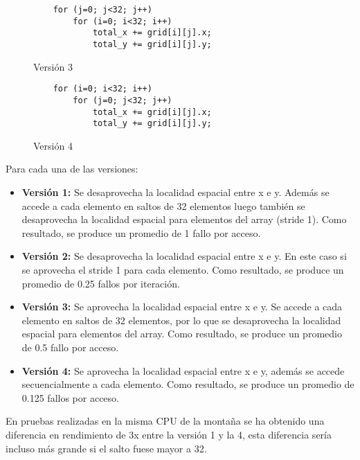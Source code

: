 \begin{ejemplo}
    \begin{figure}[H]
        \centering
        \begin{minipage}{0.4\textwidth}
            \begin{verbatim}
    for (j=0; j<32; j++)
        for (i=0; i<32; i++)
            total_x += grid[i][j].x;
            total_y += grid[i][j].y;
            \end{verbatim}
            \caption{Versión 3}
        \end{minipage}
        \hspace{1cm}
        \begin{minipage}{0.4\textwidth}
            \begin{verbatim}
    for (i=0; i<32; i++)
        for (j=0; j<32; j++)
            total_x += grid[i][j].x;
            total_y += grid[i][j].y;
            \end{verbatim}
            \caption{Versión 4}
        \end{minipage}
    \end{figure}
    Para cada una de las versiones:
    \begin{itemize}
        \item \textbf{Versión 1:} Se desaprovecha la localidad espacial entre x e y. Además se accede a cada elemento en saltos de 32 elementos luego también se desaprovecha la localidad
            espacial para elementos del array (stride 1). Como resultado, se produce un promedio de 1 fallo por acceso.
        \item \textbf{Versión 2:} Se desaprovecha la localidad espacial entre x e y. En este caso si se aprovecha el stride 1 para cada elemento. Como resultado, se produce un promedio de 0.25 fallos por iteración.
        \item \textbf{Versión 3:} Se aprovecha la localidad espacial entre x e y. Se accede a cada elemento en saltos de 32 elementos, por lo que se desaprovecha la localidad espacial para elementos del array. Como resultado, se produce un promedio de 0.5 fallo por acceso.
        \item \textbf{Versión 4:} Se aprovecha la localidad espacial entre x e y, además se accede secuencialmente a cada elemento. Como resultado, se produce un promedio de 0.125 fallos por acceso.
    \end{itemize}
    En pruebas realizadas en la misma CPU de la montaña se ha obtenido una diferencia en rendimiento de 3x entre la versión 1 y la 4, esta diferencia sería incluso más grande si el salto fuese mayor a 32.
\end{ejemplo}




